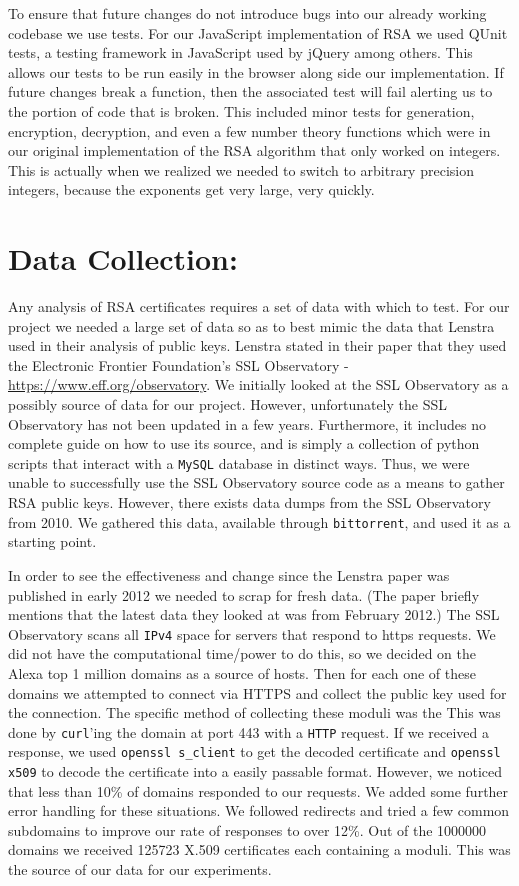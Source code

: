 \documentclass[11pt,twoside]{article}
\newcommand{\ty}[1]{\texttt{#1}}
\begin{document}
\begin{multicols}{2}
To ensure that future changes do not introduce bugs into our already working
codebase we use tests. For our JavaScript implementation of RSA we used QUnit
tests, a testing framework in JavaScript used by jQuery among others. This
allows our tests to be run easily in the browser along side our implementation.
If future changes break a function, then the associated test will fail alerting
us to the portion of code that is broken.  
This included minor tests for generation, encryption, decryption, and
even a few number theory functions which were in our original implementation of
the RSA algorithm that only worked on integers. This is actually when we
realized we needed to switch to arbitrary precision integers, because the
exponents get very large, very quickly.

\section{Data Collection:}
Any analysis of RSA certificates requires a set of data with which to test. For
our project we needed a large set of data so as to best mimic the data that
Lenstra used in their analysis of public keys. Lenstra stated in
their paper that they used the Electronic Frontier Foundation's SSL Observatory
- \url{https://www.eff.org/observatory}. We initially looked at the SSL
Observatory as a possibly source of data for our project. However,
unfortunately the SSL Observatory has not been updated in a few years.
Furthermore, it includes no complete guide on how to use its source, and is
simply a collection of python scripts that interact with a \ty{MySQL} database
in distinct ways. Thus, we were unable to successfully use the SSL Observatory
source code as a means to gather RSA public keys. However, there exists data
dumps from the SSL Observatory from 2010. We gathered this data, available
through \ty{bittorrent}, and used it as a starting point.

In order to see the effectiveness and change since the Lenstra paper was
published in early 2012 we needed to scrap for fresh data. (The paper briefly
mentions that the latest data they looked at was from February 2012.) The SSL
Observatory scans all \ty{IPv4} space for servers that respond to https 
requests. We
did not have the computational time/power to do this, so we decided on the Alexa
top 1 million domains as a source of hosts. Then for each one of these domains
we attempted to connect via HTTPS and collect the public key used for the
connection. The specific method of collecting these moduli was the  This was
done by \ty{curl}'ing the domain at port 443 with a \ty{HTTP} request. If we 
received a
response, we used \ty{openssl s\_client} to get the decoded certificate and
\ty{openssl x509} to decode the certificate into a easily passable format.
However, we noticed that less than 10\% of domains responded to our requests. We
added some further error handling for these situations. We followed redirects
and tried a few common subdomains to improve our rate of responses to over 12\%.
Out of the 1000000 domains we received 125723 X.509 certificates each containing
a moduli. This was the source of our data for our experiments.


\end{multicols}
\end{document}
